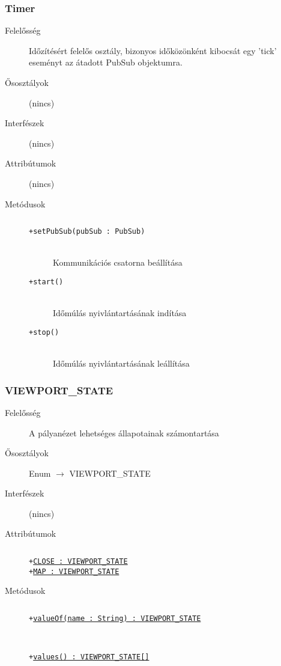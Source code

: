 		\subsubsection{Timer}
			\begin{description}

				\item[Felelősség] Időzítésért felelős osztály, bizonyos időközönként kibocsát egy 'tick' eseményt az átadott PubSub objektumra.

				\item[Ősosztályok] (nincs)
				\item[Interfészek] (nincs)
				\item[Attribútumok] (nincs)
				\item[Metódusok]$\ $
					\begin{description}
						\item[\texttt{+setPubSub(pubSub : PubSub)}] \hfill \\Kommunikációs csatorna beállítása 
						\item[\texttt{+start()}] \hfill \\Időmúlás nyivlántartásának indítása 
						\item[\texttt{+stop()}] \hfill \\Időmúlás nyivlántartásának leállítása 
					\end{description}
			\end{description}

		\subsubsection{VIEWPORT\_STATE}
			\begin{description}

				\item[Felelősség] A pályanézet lehetséges állapotainak számontartása

				\item[Ősosztályok] Enum $\rightarrow{}$ VIEWPORT\_STATE
				\item[Interfészek] (nincs)
				\item[Attribútumok]$\ $
					\begin{description}
						\item[\texttt{+\underline{CLOSE : VIEWPORT\_STATE}}]%
						\item[\texttt{+\underline{MAP : VIEWPORT\_STATE}}]%
					\end{description}
				\item[Metódusok]$\ $
					\begin{description}
						\item[\texttt{+\underline{valueOf(name : String) : VIEWPORT\_STATE}}] \hfill \\
						\item[\texttt{+\underline{values() : VIEWPORT\_STATE[]}}] \hfill \\
					\end{description}
			\end{description}

